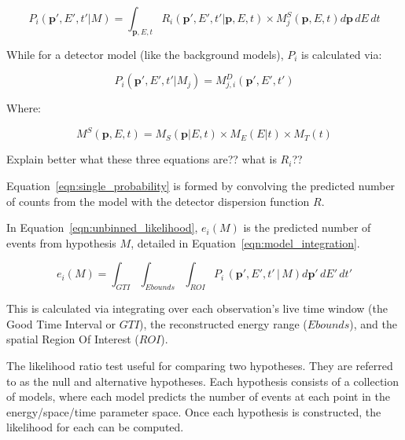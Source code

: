   \begin{equation}\label{eqn:single_probability}
    P_i \left ( \boldsymbol{p}', E', t' | M \right ) = \int_{ \boldsymbol{p},E,t} R_i \left( \boldsymbol{p}',E',t'| \boldsymbol{p},E,t \right ) \times M_j^S \left( \boldsymbol{p}, E, t \right ) d\boldsymbol{p} \, dE \, dt
  \end{equation}
  
  While for a detector model (like the background models), $P_i$ is calculated via:
  
  \begin{equation}
    P_i \left ( \boldsymbol{p}', E', t' | M_j \right ) = M^D_{j,i} \left ( \boldsymbol{p}', E', t' \right )
  \end{equation}
  
  Where:

  \begin{equation}
    M^S \left ( \boldsymbol{p}, E, t \right ) = M_S \left ( \boldsymbol{p}|E,t \right ) \times M_E \left ( E | t \right ) \times M_T \left ( t \right )
  \end{equation}
  
  {\color{red} Explain better what these three equations are??  what is $R_i$??}
  
  Equation~\ref{eqn:single_probability} is formed by convolving the predicted number of counts from the model with the detector dispersion function $R$.
  
  In Equation~\ref{eqn:unbinned_likelihood}, $e_i \left ( M \right )$ is the predicted number of events from hypothesis $M$, detailed in Equation~\ref{eqn:model_integration}.

  \begin{equation}\label{eqn:model_integration}
    e_i \left(M \right ) = \int_{GTI} \int_{Ebounds} \int_{ROI} P_i \, \left( \boldsymbol{p}', E', t' \, | \, M \right ) d\boldsymbol{p}' \, dE' \, dt'
  \end{equation}
  
  This is calculated via integrating over each observation's live time window (the Good Time Interval or $GTI$), the reconstructed energy range ($Ebounds$), and the spatial Region Of Interest ($ROI$).
  
  
  The likelihood ratio test useful for comparing two hypotheses.
  They are referred to as the null and alternative hypotheses.
  Each hypothesis consists of a collection of models, where each model predicts the number of events at each point in the energy/space/time parameter space.
  Once each hypothesis is constructed, the likelihood for each can be computed.
  
